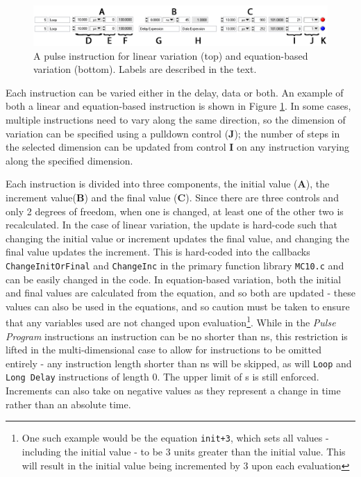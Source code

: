 \documentclass[PaulGanssle-Thesis.tex]{subfiles}
\begin{document}
\begin{figure}[!h]
\includegraphics[width=\tw]{figures/console/PulseInstruction2D.png}
\caption{A pulse instruction for linear variation (top) and equation-based variation (bottom). Labels are described in the text.}
\label{fig:PulseInstruction2D}
\end{figure}

Each instruction can be varied either in the delay, data or both. An example of both a linear and equation-based instruction is shown in Figure \ref{fig:PulseInstruction2D}. In some cases, multiple instructions need to vary along the same direction, so the dimension of variation can be specified using a pulldown control (\textbf{J}); the number of steps in the selected dimension can be updated from control \textbf{I} on any instruction varying along the specified dimension.

Each instruction is divided into three components, the initial value (\textbf{A}), the increment value(\textbf{B}) and the final value (\textbf{C}). Since there are three controls and only 2 degrees of freedom, when one is changed, at least one of the other two is recalculated. In the case of linear variation, the update is hard-code such that changing the initial value or increment updates the final value, and changing the final value updates the increment. This is hard-coded into the callbacks \texttt{ChangeInitOrFinal} and \texttt{ChangeInc} in the primary function library \texttt{MC10.c} and can be easily changed in the code. In equation-based variation, both the initial and final values are calculated from the equation, and so both are updated - these values can also be used in the equations, and so caution must be taken to ensure that any variables used are not changed upon evaluation\footnote{One such example would be the equation \texttt{init+3}, which sets all values - including the initial value - to be 3 units greater than the initial value. This will result in the initial value being incremented by 3 upon each evaluation}. While in the \textit{Pulse Program} instructions an instruction can be no shorter than \unit[100]{ns}, this restriction is lifted in the multi-dimensional case to allow for instructions to be omitted entirely - any instruction length shorter than \unit[100]{ns} will be skipped, as will \texttt{Loop} and \texttt{Long Delay} instructions of length 0. The upper limit of \unit[21]{s} is still enforced. Increments can also take on negative values as they represent a change in time rather than an absolute time.
\end{document}
